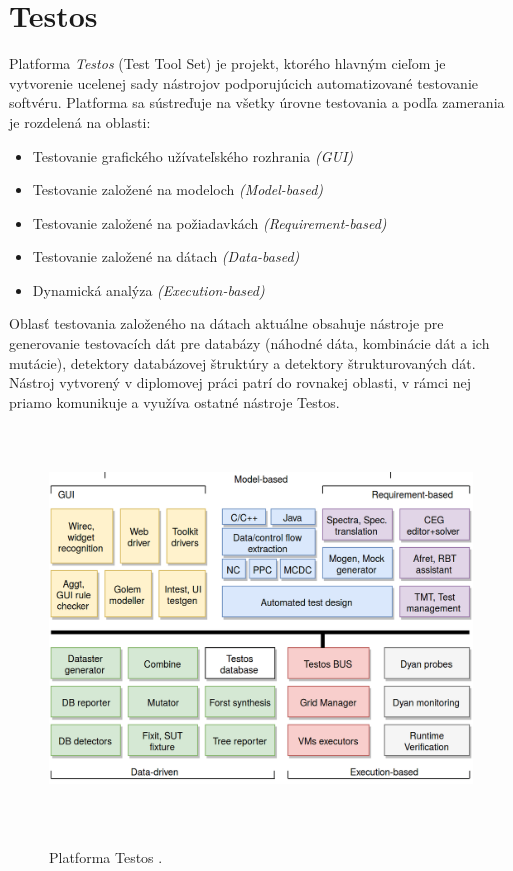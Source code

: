 \section{Testos}
Platforma \textit{Testos} (Test Tool Set) \cite{Testos} je projekt, ktorého hlavným cieľom je vytvorenie ucelenej sady nástrojov podporujúcich automatizované testovanie softvéru. Platforma sa sústreďuje na všetky úrovne testovania a podľa zamerania je rozdelená na oblasti:
\begin{itemize}
	\item{Testovanie grafického užívateľského rozhrania \textit{(GUI)}
	}
	\item{Testovanie založené na modeloch \textit{(Model-based)}
	}
	\item{Testovanie založené na požiadavkách \textit{(Requirement-based)}
	} 	
	\item{Testovanie založené na dátach \textit{(Data-based)}
	} 	
	\item{Dynamická analýza \textit{(Execution-based)}
	} 	
\end{itemize}  
Oblasť testovania založeného na dátach aktuálne obsahuje nástroje pre generovanie testovacích dát pre databázy (náhodné dáta, kombinácie dát a ich mutácie), detektory databázovej štruktúry a detektory štrukturovaných dát. Nástroj vytvorený v diplomovej práci patrí do rovnakej oblasti, v rámci nej priamo komunikuje a využíva ostatné nástroje Testos.

\begin{figure}[h]\centering
	\centering
	\includegraphics[width=6.0in,height=4.2in]{obrazky-figures/testos.png}\\[1pt]
	\caption{Platforma Testos \cite{Testos}.}
	\label{testos_img}
\end{figure} 


